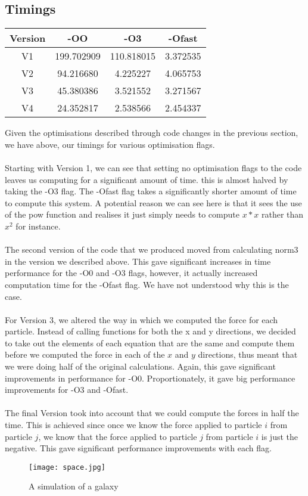 \documentclass[12pt]{article}
\begin{document}
\subsection{Timings}
\begin{center}
\begin{tabular}{|c|c|c|c|}
\hline
Version & -OO & -O3 & -Ofast\\
\hline
V1 & 199.702909 & 110.818015 & 3.372535\\
V2 & 94.216680 & 4.225227 & 4.065753\\
V3 & 45.380386 & 3.521552 & 3.271567\\
V4 & 24.352817 & 2.538566 & 2.454337\\
\hline
\end{tabular}
\end{center}
Given the optimisations described through code changes in the previous section, we have above, our timings for various optimisation flags. 
\\\\
Starting with Version 1, we can see that setting no optimisation flags to the code leaves us computing for a significant amount of time. this is almost halved by taking the -O3 flag. The -Ofast flag takes a significantly shorter amount of time to compute this system. A potential reason we can see here is that it sees the use of the pow function and realises it just simply needs to compute $x*x$ rather than $x^2$ for instance. 
\\\\
The second version of the code that we produced moved from calculating norm3 in the version we described above. This gave significant increases in time performance for the -O0 and -O3 flags, however, it actually increased computation time for the -Ofast flag. We have not understood why this is the case. 
\\\\
For Version 3, we altered the way in which we computed the force for each particle. Instead of calling functions for both the x and y directions, we decided to take out the elements of each equation that are the same and compute them before we computed the force in each of the $x$ and $y$ directions, thus meant that we were doing half of the original calculations. Again, this gave significant improvements in performance for -O0. Proportionately, it gave big performance improvements for -O3 and -Ofast. 
\\\\
The final Version took into account that we could compute the forces in half the time. This is achieved since once we know the force applied to particle $i$ from particle $j$, we know that the force applied to particle $j$ from particle $i$ is just the negative. This gave significant performance improvements with each flag. 
\begin{figure}[htb]
\begin{center}
\texttt{[image: space.jpg]}
\caption{A simulation of a galaxy}
\end{center}
\end{figure}
\newpage
\end{document}
